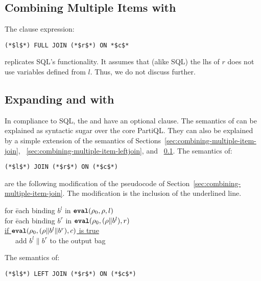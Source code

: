 \subsection{Combining Multiple \from Items with \FULLJOIN}
\label{sec:combining-multiple-item-full-outerjoin}

The \from clause expression:

\begin{lstlisting}
(*$l$*) FULL JOIN (*$r$*) ON *$c$*
\end{lstlisting}

\noindent replicates SQL's  functionality. It
assumes that (alike SQL) the lhs of $r$ does not use variables defined from $l$. 
Thus, we do not discuss further.

\subsection{Expanding \JOIN and \LEFTJOIN with \on}
\label{sec:rewriting-on}

In compliance to SQL, the \JOIN and \LEFTJOIN have an optional \on
clause. The semantics of  can be explained as syntactic sugar over the core
PartiQL. They can also be explained by a simple extension of the semantics of
Sections~\ref{sec:combining-multiple-item-join},
~\ref{sec:combining-multiple-item-leftjoin}, and
~\ref{sec:combining-multiple-item-full-outerjoin}. The semantics of:

\begin{lstlisting}
(*$l$*) JOIN (*$r$*) ON (*$c$*)
\end{lstlisting}

\noindent are the following modification of the pseudocode of
Section~\ref{sec:combining-multiple-item-join}. The modification is the
inclusion of the underlined line.

\begin{tabbing}
for \=each binding $b^l$ in $\texttt{\textbf{eval}}(\rho_{0}, \rho, l)$\\
\>for \=each binding $b^r$ in $\texttt{\textbf{eval}}(\rho_{0}, (\rho \| b^l), r)$\\
\>\>\underline{if $\texttt{\textbf{eval}}(\rho_{0}, (\rho \| b^l \| b^r), c)$ is true}\\
\>\>\ \ \ add $b^l \| b^r$ to the output bag
\end{tabbing}

\noindent The semantics of:

\begin{lstlisting}
(*$l$*) LEFT JOIN (*$r$*) ON (*$c$*)
\end{lstlisting}

